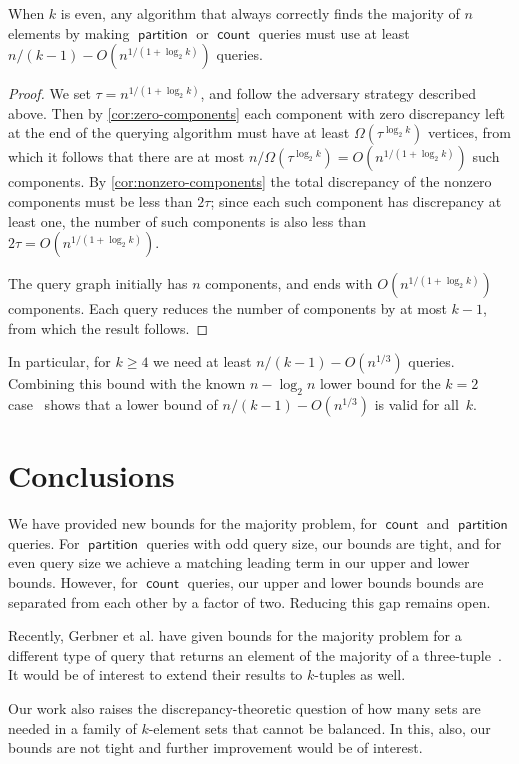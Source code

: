 \documentclass[11pt]{llncs}
\newcommand{\qcount}{\operatorname{\mathsf{count}}}
\newcommand{\qpart}{\operatorname{\mathsf{partition}}}
\newcommand{\threshold}{\tau}
\begin{document}
\begin{theorem}
When $k$ is even, any algorithm that always correctly finds the majority of $n$ elements by making $\qpart$ or $\qcount$ queries must use at least $n/(k-1) - O(n^{1/(1+\log_2 k)})$ queries.
\end{theorem}

\begin{proof}
We set $\threshold=n^{1/(1+\log_2 k)}$, and follow the adversary strategy described above.
Then by \autoref{cor:zero-components} each component with zero discrepancy left at the end of the querying algorithm must have at least $\Omega(\threshold^{\log_2 k})$ vertices, from which it follows that there are at most $n/\Omega(\threshold^{\log_2 k})=O(n^{1/(1+\log_2 k)})$ such components. By \autoref{cor:nonzero-components} the total discrepancy of the nonzero components must be less than $2\threshold$; since each such component has discrepancy at least one, the number of such components is also less than $2\threshold=O(n^{1/(1+\log_2 k)})$.

The query graph initially has $n$ components, and ends with $O(n^{1/(1+\log_2 k)})$ components.
Each query reduces the number of components by at most $k-1$, from which the result follows.
\end{proof}

In particular, for $k\ge 4$ we need at least $n/(k-1)-O(n^{1/3})$ queries. Combining this bound with the known $n-\log_2 n$ lower bound for the $k=2$ case~\cite{SakWer-Comb-91} shows that a lower bound of $n/(k-1)-O(n^{1/3})$ is valid for all~$k$.
\fi

\section{Conclusions}
We have provided new bounds for the majority problem, for $\qcount$ and $\qpart$ queries. For $\qpart$ queries with odd query size, our bounds are tight, and for even query size we achieve a matching leading term in our upper and lower bounds. However,  for $\qcount$ queries, our upper and lower bounds bounds are separated from each other by a factor of two. Reducing this gap remains open.

Recently, Gerbner et al. have given bounds for the majority problem for a different type of query that returns an element of the majority of a three-tuple~\cite{GerKesPal-EC-15}. It would be of interest to extend their results to $k$-tuples as well.

Our work also raises the discrepancy-theoretic question of how many sets are needed in a family of $k$-element sets that cannot be balanced. In this, also, our bounds are not tight and further improvement would be of interest.

{
\ifFull
\raggedright

\else

\fi
}
\end{document}
